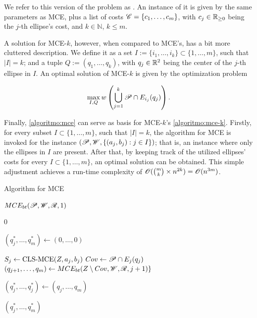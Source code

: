We refer to this version of the problem as  . An instance of it is given by the same parameters as MCE, plus a list of costs $\mathscr{C}=\{c_1, \dots, c_m\}$, with $c_j\in\mathbb{R}_{\ge0}$ being the $j$-th ellipse's cost, and $k\in\mathbb{N}$, $k\le m$.

 A solution for MCE-$k$, however,  when compared to MCE's, has a bit more cluttered description. We define it as a set $I:=\{i_1, \dots, i_k\}\subset\{1, \dots, m\}$, such that $|I|=k$; and a tuple $Q:=(q_1, \dots, q_k)$, with $q_j\in\mathbb{R}^2$ being the center of the $j$-th ellipse in $I$. An optimal solution of MCE-$k$ is given by the optimization problem

\begin{equation*}
\max_{I, Q} w\left(\bigcup_{j=1}^k \mathscr{P} \cap E_{i_j}(q_j)\right).
\end{equation*}

Finally, \autoref{algoritmo:mce} can serve as basis for MCE-$k$'s \autoref{algoritmo:mce-k}. 
Firstly, for every subset $I \subset \{1, \dots, m\}$, such that $|I| = k$, the algorithm for MCE is invoked for the instance $(\mathscr{P}, \mathscr{W}, \{(a_j, b_j) : j \in I\})$; that is, an instance where only the ellipses in $I$ are present.
After that, by keeping track of the utilized ellipses' costs for every $I \subset \{1, \dots, m\}$, an optimal solution can be obtained.
This simple adjustment achieves a run-time complexity of $\mathscr{O}(\binom{m}{k} \times n^{2k}) = \mathscr{O}(n^{3m})$. 

\begin{algoritmo}
    \caption{Algorithm for MCE}\label{algoritmo:mce}
    
    \begin{algorithmic}[1]
        
        
        \item[]
	    \State \Return $MCE_{bt}(\mathscr{P}, \mathscr{W}, \mathscr{R}, 1)$
        \EndProcedure
        
        \State \Return $0$
        \EndIf
        
        \State $(q_j^*, \dots, q_m^*) \gets (0, \dots, 0)$

        \State $S_j \gets \textnormal{CLS-MCE}(Z, a_j, b_j)$
        \State $Cov \gets \mathscr{P} \cap E_j(q_j)$
        \State $(q_{j+1}, \dots, q_m) \gets MCE_{bt}(Z \setminus Cov, \mathscr{W}, \mathscr{R}, j+1)\}$
        
        \State $(q_j^*, \dots, q_j^*) \gets(q_j, \dots, q_m)$
        \EndIf
        \EndFor

        \State \Return $(q_j^*, \dots, q_m^*)$
        \EndProcedure
    \end{algorithmic}
\end{algoritmo}

